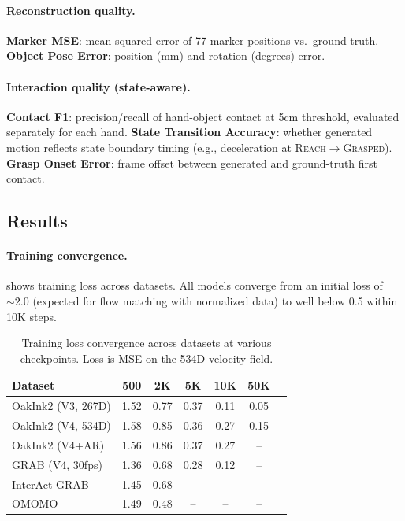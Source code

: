 \paragraph{Reconstruction quality.}
\textbf{Marker MSE}: mean squared error of 77 marker positions vs.\ ground truth.
\textbf{Object Pose Error}: position (mm) and rotation (degrees) error.

\paragraph{Interaction quality (state-aware).}
\textbf{Contact F1}: precision/recall of hand-object contact at 5cm threshold, evaluated separately for each hand.
\textbf{State Transition Accuracy}: whether generated motion reflects state boundary timing (e.g., deceleration at \textsc{Reach}$\rightarrow$\textsc{Grasped}).
\textbf{Grasp Onset Error}: frame offset between generated and ground-truth first contact.

\subsection{Results}
\label{sec:results}

\paragraph{Training convergence.}
 shows training loss across datasets. All models converge from an initial loss of ${\sim}2.0$ (expected for flow matching with normalized data) to well below 0.5 within 10K steps.

\begin{table}[t]
  \caption{Training loss convergence across datasets at various checkpoints. Loss is MSE on the 534D velocity field.}
  \label{tab:convergence}
  \begin{tabular}{@{}lcccccc@{}}
    \toprule
    Dataset & 500 & 2K & 5K & 10K & 50K \\
    \midrule
    OakInk2 (V3, 267D)  & 1.52 & 0.77 & 0.37 & 0.11 & 0.05 \\
    OakInk2 (V4, 534D)  & 1.58 & 0.85 & 0.36 & 0.27 & 0.15 \\
    OakInk2 (V4+AR)     & 1.56 & 0.86 & 0.37 & 0.27 & -- \\
    GRAB (V4, 30fps)    & 1.36 & 0.68 & 0.28 & 0.12 & -- \\
    InterAct GRAB        & 1.45 & 0.68 & -- & -- & -- \\
    OMOMO                & 1.49 & 0.48 & -- & -- & -- \\
    \bottomrule
  \end{tabular}
\end{table}

